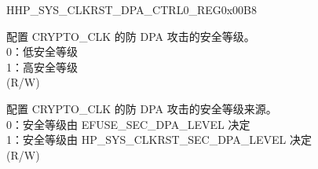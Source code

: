 \begin{register}{H}{HP\_SYS\_CLKRST\_DPA\_CTRL0\_REG}{0x00B8}\label{regdesc:HPSYSCLKRSTDPACTRL0REG}
%
%
%
\regnewline%
\begin{regdesc}\begin{reglist}
\label{fielddesc:HPSYSCLKRSTSECDPALEVEL}\item [HP\_SYS\_CLKRST\_SEC\_DPA\_LEVEL] 配置 CRYPTO\_CLK 的防 DPA 攻击的安全等级。\\
0：低安全等级\\
1：高安全等级\\ (R/W)
\label{fielddesc:HPSYSCLKRSTSECDPACFGSEL}\item [HP\_SYS\_CLKRST\_SEC\_DPA\_CFG\_SEL] 配置 CRYPTO\_CLK 的防 DPA 攻击的安全等级来源。\\
0：安全等级由 EFUSE\_SEC\_DPA\_LEVEL 决定\\
1：安全等级由 HP\_SYS\_CLKRST\_SEC\_DPA\_LEVEL 决定\\ (R/W)
\end{reglist}\end{regdesc}
\end{register}


